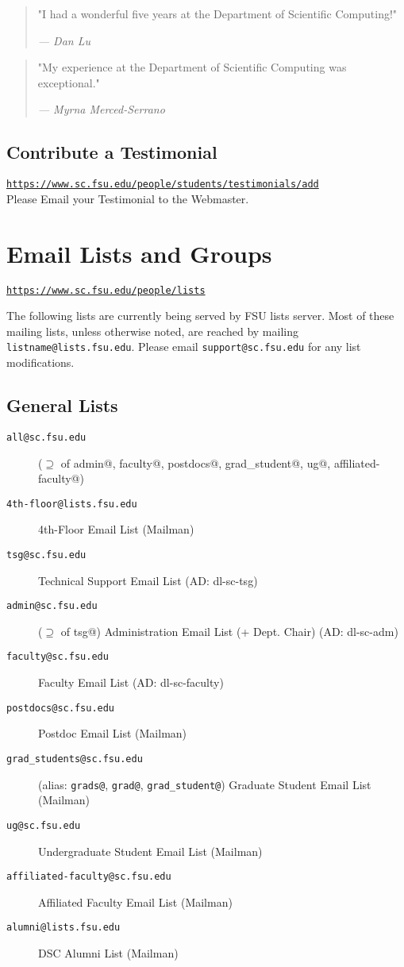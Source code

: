 \documentclass[12pt,a4paper]{article}
\begin{document}
\begin{quote}
"I had a wonderful five years at the Department of Scientific Computing!"
\par\raggedleft\textit{--- Dan Lu}
\end{quote}

\begin{quote}
"My experience at the Department of Scientific Computing was exceptional."
\par\raggedleft\textit{--- Myrna Merced-Serrano}
\end{quote}

\subsection{Contribute a Testimonial}
\texttt{\url{https://www.sc.fsu.edu/people/students/testimonials/add}}\\
Please Email your Testimonial to the Webmaster.

\section{Email Lists and Groups}
\texttt{\url{https://www.sc.fsu.edu/people/lists}}

The following lists are currently being served by FSU lists server. Most of these mailing lists, unless otherwise noted, are reached by mailing \texttt{listname@lists.fsu.edu}. Please email \texttt{support@sc.fsu.edu} for any list modifications.

\subsection{General Lists}
\begin{description}
    \item[\texttt{all@sc.fsu.edu}] ($\supseteq$ of admin@, faculty@, postdocs@, grad\_student@, ug@, affiliated-faculty@)
    \item[\texttt{4th-floor@lists.fsu.edu}] 4th-Floor Email List (Mailman)
    \item[\texttt{tsg@sc.fsu.edu}] Technical Support Email List (AD: dl-sc-tsg)
    \item[\texttt{admin@sc.fsu.edu}] ($\supseteq$ of tsg@) Administration Email List (+ Dept. Chair) (AD: dl-sc-adm)
    \item[\texttt{faculty@sc.fsu.edu}] Faculty Email List (AD: dl-sc-faculty)
    \item[\texttt{postdocs@sc.fsu.edu}] Postdoc Email List (Mailman)
    \item[\texttt{grad\_students@sc.fsu.edu}] (alias: \texttt{grads@}, \texttt{grad@}, \texttt{grad\_student@}) Graduate Student Email List (Mailman)
    \item[\texttt{ug@sc.fsu.edu}] Undergraduate Student Email List (Mailman)
    \item[\texttt{affiliated-faculty@sc.fsu.edu}] Affiliated Faculty Email List (Mailman)
    \item[\texttt{alumni@lists.fsu.edu}] DSC Alumni List (Mailman)
\end{description}
\end{document}
